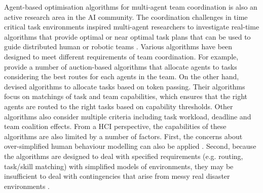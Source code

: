
Agent-based optimisation algorithms for multi-agent team coordination is also an active research area in the \ac{AI} community. The coordination challenges in time critical task environments inspired multi-agent researchers to investigate real-time algorithms that provide optimal or near optimal task plans that can be used to guide distributed human or robotic teams \citep{Kitano2000}. Various algorithms have been designed to meet different requirements of team coordination. For example, \cite{Lagoudakis2005} provide a number of auction-based algorithms that allocate agents to tasks considering the best routes for each agents in the team. On the other hand, \cite{Scerri2005a} devised algorithms to allocate tasks based on token passing. Their algorithms focus on matchings of task and team capabilities, which ensures that the right agents are routed to the right tasks based on capability thresholds. Other algorithms \citep{Ramchurn2010,Koes2005} also consider multiple criteria including task workload, deadline and team coalition effects. From a \ac{HCI} perspective, the capabilities of these algorithms are also limited by a number of factors. First, the concerns about over-simplified human behaviour modelling can also be applied \citep{Drury2009}. Second, because the algorithms are designed to deal with specified requirements (e.g. routing, task/skill matching) with simplified models of environments, they may be insufficient to deal with contingencies that arise from messy real disaster environments \citep{Armenakis2012}.\\

